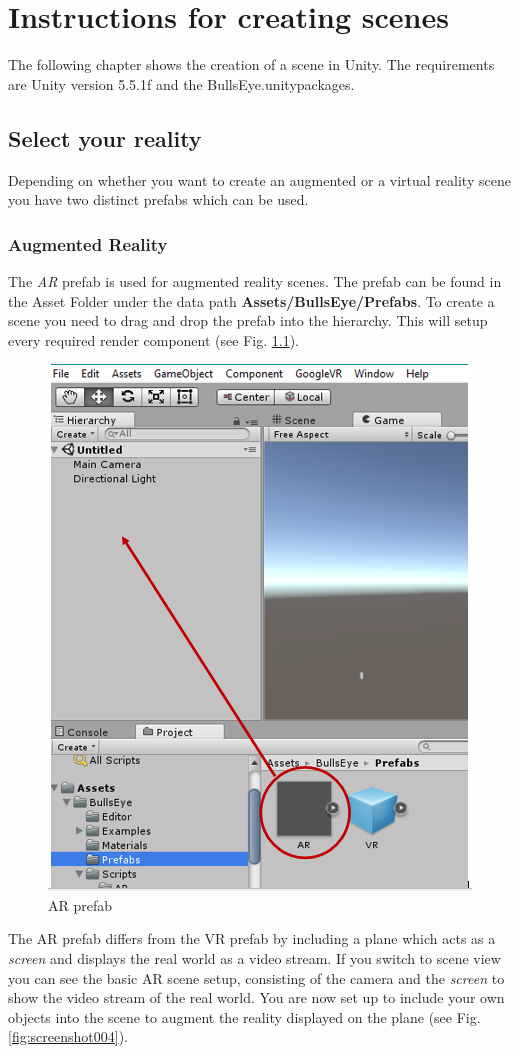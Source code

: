 \documentclass[../../Instructions_Framework]{subfiles}
\begin{document}
\chapter{Instructions for creating scenes}
The following chapter shows the creation of a scene in Unity. The requirements are Unity version 5.5.1f and the BullsEye.unitypackages.\\
\section{Select your reality}
Depending on whether you want to create an augmented or a virtual reality scene you have two distinct prefabs which can be used.
\subsection{Augmented Reality}
The \textit{AR} prefab is used for augmented reality scenes. The prefab can be found in the Asset Folder under the data path \textbf{Assets/BullsEye/Prefabs}. To create a scene you need to drag and drop the prefab into the hierarchy. This will setup every required render component (see Fig. \ref{fig:screenshot002}).
\begin{figure}
	\centering
	\includegraphics[width=0.7\linewidth]{img/screenshot002}
	\caption{AR prefab}
	\label{fig:screenshot002}
\end{figure}
The AR prefab differs from the VR prefab by including a plane which acts as a \textit{screen} and displays the real world as a video stream. If you switch to scene view you can see the basic AR scene setup, consisting of the camera and the \textit{screen} to show the video stream of the real world. You are now set up to include your own objects into the scene to augment the reality displayed on the plane (see Fig. \ref{fig:screenshot004}).
\end{document}

